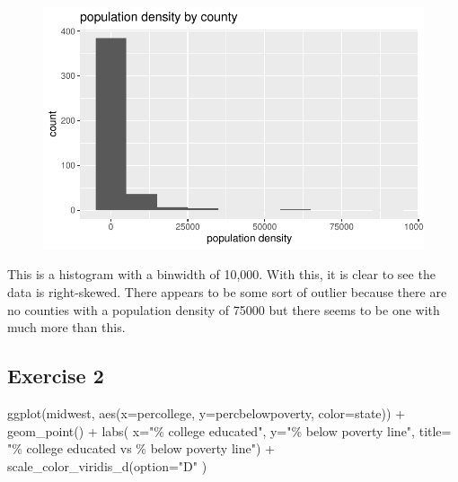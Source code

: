 \documentclass[
  letterpaper,
  DIV=11,
  numbers=noendperiod]{scrartcl}
\newenvironment{Shaded}{\begin{snugshade}}{\end{snugshade}}
\newcommand{\AttributeTok}[1]{\textcolor[rgb]{0.40,0.45,0.13}{#1}}
\newcommand{\FunctionTok}[1]{\textcolor[rgb]{0.28,0.35,0.67}{#1}}
\newcommand{\NormalTok}[1]{\textcolor[rgb]{0.00,0.23,0.31}{#1}}
\newcommand{\SpecialCharTok}[1]{\textcolor[rgb]{0.37,0.37,0.37}{#1}}
\newcommand{\StringTok}[1]{\textcolor[rgb]{0.13,0.47,0.30}{#1}}
\begin{document}
\begin{figure}[H]

{\centering \includegraphics{lab-1_files/figure-pdf/histogram-of-population-density-of-counties-1.pdf}

}

\end{figure}

This is a histogram with a binwidth of 10,000. With this, it is clear to
see the data is right-skewed. There appears to be some sort of outlier
because there are no counties with a population density of 75000 but
there seems to be one with much more than this.

\hypertarget{exercise-2}{%
\subsection{Exercise 2}\label{exercise-2}}

\begin{Shaded}
\begin{Highlighting}[]
\FunctionTok{ggplot}\NormalTok{(midwest, }\FunctionTok{aes}\NormalTok{(}\AttributeTok{x=}\NormalTok{percollege, }\AttributeTok{y=}\NormalTok{percbelowpoverty, }\AttributeTok{color=}\NormalTok{state)) }\SpecialCharTok{+}
  \FunctionTok{geom\_point}\NormalTok{() }\SpecialCharTok{+}
  \FunctionTok{labs}\NormalTok{( }\AttributeTok{x=}\StringTok{"\% college educated"}\NormalTok{,}
    \AttributeTok{y=}\StringTok{"\% below poverty line"}\NormalTok{,}
    \AttributeTok{title=} \StringTok{"\% college educated vs \% below poverty line"}\NormalTok{) }\SpecialCharTok{+}
  \FunctionTok{scale\_color\_viridis\_d}\NormalTok{(}\AttributeTok{option=}\StringTok{"D"}\NormalTok{ )}
\end{Highlighting}
\end{Shaded}
\end{document}
